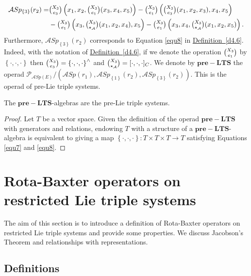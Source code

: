 \documentclass[11pt, twoside]{article}
\begin{document}
\begin{align*}
    \mathcal{A}Sp_{\left\{3\right\}}(r_2) =& \tbinom{X_3}{e_3}\left(x_1,x_2,\tbinom{X_3}{e_1}(x_3,x_4,x_5) \right)- \tbinom{X_3}{e_1}\left(\tbinom{X_3}{e_3}(x_1,x_2,x_3),x_4,x_5 \right)\\ & - \tbinom{X_3}{e_1}\left(x_3,\tbinom{X_3}{\star_\mathcal{A}}(x_1,x_2,x_4),x_5 \right) - \tbinom{X_3}{e_1}\left(x_3,x_4,\tbinom{X_3}{\star_\mathcal{A}}(x_1,x_2,x_5) \right).
\end{align*} 
Furthermore, $\mathcal{A}Sp_{\left\{3\right\}}(r_2) $ corresponds to Equation \eqref{equ8} in  \hyperref[d4.6]{Definition~\ref*{d4.6}}. Indeed, with the notation of  \hyperref[d4.6]{Definition~\ref*{d4.6}}, if we denote the operation $\tbinom{X_3}{e_1} $ by $\left\{\cdot,\cdot,\cdot\right\} $ then $\tbinom{X_3}{e_3}= \left\{\cdot,\cdot,\cdot\right\}^\wedge $ and $\tbinom{X_3}{\star_{\mathcal{A}}}= [\cdot,\cdot,\cdot]_C $. We denote by $\mathbf{pre-LTS} $ the operad $\mathcal{P}_{\mathcal{A}Sp(E)}/(\mathcal{A}Sp(r_1), \mathcal{A}Sp_{\left\{1\right\}}(r_2),     \mathcal{A}Sp_{\left\{3\right\}}(r_2)) $. This is the operad of pre-Lie triple systems.

\begin{prop}
    The $\mathbf{pre-LTS} $-algebras are the pre-Lie triple systems.
\end{prop}

\begin{proof}
    Let $T$ be a vector space. Given the definition of the operad $\mathbf{pre-LTS} $ with generators and relations, endowing $T$ with a structure of a $\mathbf{pre-LTS}$-algebra is equivalent to giving a map $\left\{\cdot,\cdot,\cdot\right\}: T\times T\times T\to T $ satisfying Equations \eqref{equ7} and \eqref{equ8}.
\end{proof}

\section{Rota-Baxter operators on restricted Lie triple systems}\label{s5}
The aim of this section is to introduce a definition of Rota-Baxter operators on restricted Lie triple systems and provide some properties. We discuss Jacobson's Theorem and relationships with representations.
\subsection{Definitions}
\end{document}
